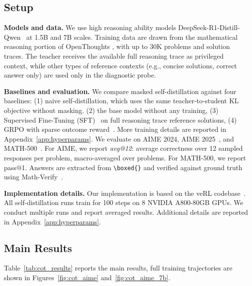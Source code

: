 \documentclass[11pt]{article}
\begin{document}
\subsection{Setup}

\textbf{Models and data.}
We use high reasoning ability models DeepSeek-R1-Distill-Qwen~\cite{guo2025deepseek} at 1.5B and 7B scales.
Training data are drawn from the mathematical reasoning portion of OpenThoughts \cite{guha2025openthoughts}, with up to 30K problems and solution traces.
The teacher receives the available full reasoning trace as privileged context, while other types of reference contexts (e.g., concise solutions, correct answer only) are used only in the diagnostic probe.

\textbf{Baselines and evaluation.}
We compare masked self-distillation against four baselines: (1) naive self-distillation, which uses the same teacher-to-student KL objective without masking. (2) the base model without any training, (3) Supervised Fine-Tuning (SFT)~\cite{ouyang2022training} on full reasoning trace reference solutions, (4) GRPO with sparse outcome reward~\cite{shao2024deepseekmath}.
More training details are reported in Appendix~\ref{app:hyperparams}.
We evaluate on AIME 2024, AIME 2025~\cite{guo2025deepseek}, and MATH-500~\cite{hendrycks2021measuring}.
For AIME, we report \textit{avg@12}: average correctness over 12 sampled responses per problem, macro-averaged over problems.
For MATH-500, we report pass@1.
Answers are extracted from \texttt{\textbackslash boxed\{\}} and verified against ground truth using Math-Verify~\cite{mathverify2024}.

\textbf{Implementation details.}
Our implementation is based on the veRL codebase~\cite{sheng2024hybridflow}.
All self-distillation runs train for 100 steps on 8 NVIDIA A800-80GB GPUs.
We conduct multiple runs and report averaged results.
Additional details are reported in Appendix~\ref{app:hyperparams}.

\subsection{Main Results}

Table~\ref{tab:cot_results} reports the main results, full training trajectories are shown in Figures~\ref{fig:cot_aime} and~\ref{fig:cot_aime_7b}.
\end{document}

